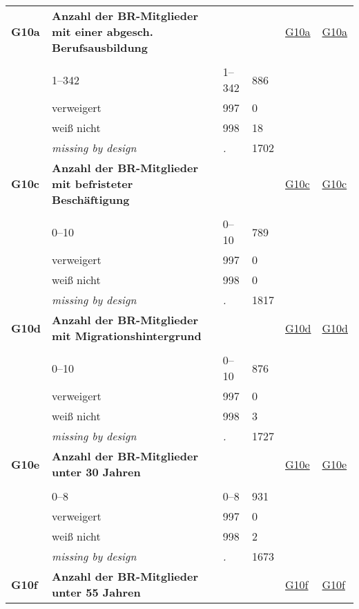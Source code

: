 \begin{longtable}{| L{2.45cm} | L{6cm} | C{1.5cm} | R{1cm} | C{2.25cm} | C{2.25cm} |}
   \midrule
\textbf{G10a}\label{var:G10a} & \textbf{Anzahl der BR-Mitglieder mit einer abgesch. Berufsausbildung} &  &  & \hyperref[G10a]{G10a} & \hyperref[var:suf:G10a]{G10a} \\ 
   &  &  &  &  &  \\ 
   & 1--342 & 1--342 & 886 &  &  \\ 
   & verweigert & 997 & 0 &  &  \\ 
   & weiß nicht & 998 & 18 &  &  \\ 
   & \textit{missing by design} & \textit{.} & 1702 &  &  \\ 
   \midrule
\textbf{G10c}\label{var:G10c} & \textbf{Anzahl der BR-Mitglieder mit befristeter Beschäftigung} &  &  & \hyperref[G10c]{G10c} & \hyperref[var:suf:G10c]{G10c} \\ 
   &  &  &  &  &  \\ 
   & 0--10 & 0--10 & 789 &  &  \\ 
   & verweigert & 997 & 0 &  &  \\ 
   & weiß nicht & 998 & 0 &  &  \\ 
   & \textit{missing by design} & \textit{.} & 1817 &  &  \\ 
   \midrule
\textbf{G10d}\label{var:G10d} & \textbf{Anzahl der BR-Mitglieder mit Migrationshintergrund} &  &  & \hyperref[G10d]{G10d} & \hyperref[var:suf:G10d]{G10d} \\ 
   &  &  &  &  &  \\ 
   & 0--10 & 0--10 & 876 &  &  \\ 
   & verweigert & 997 & 0 &  &  \\ 
   & weiß nicht & 998 & 3 &  &  \\ 
   & \textit{missing by design} & \textit{.} & 1727 &  &  \\ 
   \midrule
\textbf{G10e}\label{var:G10e} & \textbf{Anzahl der BR-Mitglieder unter 30 Jahren} &  &  & \hyperref[G10e]{G10e} & \hyperref[var:suf:G10e]{G10e} \\ 
   &  &  &  &  &  \\ 
   & 0--8 & 0--8 & 931 &  &  \\ 
   & verweigert & 997 & 0 &  &  \\ 
   & weiß nicht & 998 & 2 &  &  \\ 
   & \textit{missing by design} & \textit{.} & 1673 &  &  \\ 
   \midrule
\textbf{G10f}\label{var:G10f} & \textbf{Anzahl der BR-Mitglieder unter 55 Jahren} &  &  & \hyperref[G10f]{G10f} & \hyperref[var:suf:G10f]{G10f} \\ 

\end{longtable}
